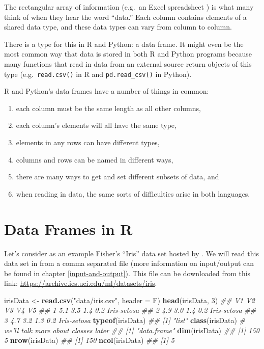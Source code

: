 \documentclass[12pt,krantz2]{krantz}
\makeatletter
\newenvironment{Shaded}{\begin{snugshade}}{\end{snugshade}}
\newcommand{\CommentTok}[1]{\textcolor[rgb]{0.37,0.37,0.37}{\textit{#1}}}
\newcommand{\DataTypeTok}[1]{\textcolor[rgb]{0.27,0.27,0.27}{#1}}
\newcommand{\DecValTok}[1]{\textcolor[rgb]{0.06,0.06,0.06}{#1}}
\newcommand{\KeywordTok}[1]{\textcolor[rgb]{0.27,0.27,0.27}{\textbf{#1}}}
\newcommand{\NormalTok}[1]{#1}
\newcommand{\StringTok}[1]{\textcolor[rgb]{0.5,0.5,0.5}{#1}}
\providecommand{\tightlist}{%
  \setlength{\itemsep}{0pt}\setlength{\parskip}{0pt}}
\newenvironment{kframe}{%
\medskip{}
\setlength{\fboxsep}{.8em}
 \def\at@end@of@kframe{}%
 \ifinner\ifhmode%
  \def\at@end@of@kframe{\end{minipage}}%
  \begin{minipage}{\columnwidth}%
 \fi\fi%
 \def\FrameCommand##1{\hskip\@totalleftmargin \hskip-\fboxsep
 \colorbox{shadecolor}{##1}\hskip-\fboxsep
     \hskip-\linewidth \hskip-\@totalleftmargin \hskip\columnwidth}%
 \MakeFramed {\advance\hsize-\width
   \@totalleftmargin\z@ \linewidth\hsize
   \@setminipage}}%
 {\par\unskip\endMakeFramed%
 \at@end@of@kframe}
\renewenvironment{Shaded}{\begin{kframe}}{\end{kframe}}
\makeatother
\begin{document}
The rectangular array of information (e.g.~an Excel spreadsheet ) is what many think of when they hear the word ``data.'' Each column contains elements of a shared data type, and these data types can vary from column to column.

There is a type for this in R and Python: a data frame. It might even be the most common way that data is stored in both R and Python programs because many functions that read in data from an external source return objects of this type (e.g.~\texttt{read.csv()} in R and \texttt{pd.read\_csv()} in Python).

R and Python's data frames have a number of things in common:

\begin{enumerate}
\def\labelenumi{\arabic{enumi}.}
\tightlist
\item
  each column must be the same length as all other columns,
\item
  each column's elements will all have the same type,
\item
  elements in any rows can have different types,
\item
  columns and rows can be named in different ways,
\item
  there are many ways to get and set different subsets of data, and
\item
  when reading in data, the same sorts of difficulties arise in both languages.
\end{enumerate}

\hypertarget{data-frames-in-r}{%
\section{Data Frames in R}\label{data-frames-in-r}}

Let's consider as an example Fisher's ``Iris'' data set \citep{misc_iris_53} hosted by \citep{uci_data}. We will read this data set in from a comma separated file (more information on input/output can be found in chapter \ref{input-and-output}). This file can be downloaded from this link: \url{https://archive.ics.uci.edu/ml/datasets/iris}.

\begin{Shaded}
\begin{Highlighting}[]
\NormalTok{irisData <-}\StringTok{ }\KeywordTok{read.csv}\NormalTok{(}\StringTok{"data/iris.csv"}\NormalTok{, }\DataTypeTok{header =}\NormalTok{ F)}
\KeywordTok{head}\NormalTok{(irisData, }\DecValTok{3}\NormalTok{)}
\CommentTok{##    V1  V2  V3  V4          V5}
\CommentTok{## 1 5.1 3.5 1.4 0.2 Iris-setosa}
\CommentTok{## 2 4.9 3.0 1.4 0.2 Iris-setosa}
\CommentTok{## 3 4.7 3.2 1.3 0.2 Iris-setosa}
\KeywordTok{typeof}\NormalTok{(irisData)}
\CommentTok{## [1] "list"}
\KeywordTok{class}\NormalTok{(irisData) }\CommentTok{# we'll talk more about classes later}
\CommentTok{## [1] "data.frame"}
\KeywordTok{dim}\NormalTok{(irisData)}
\CommentTok{## [1] 150   5}
\KeywordTok{nrow}\NormalTok{(irisData)}
\CommentTok{## [1] 150}
\KeywordTok{ncol}\NormalTok{(irisData)}
\CommentTok{## [1] 5}
\end{Highlighting}
\end{Shaded}
\end{document}
